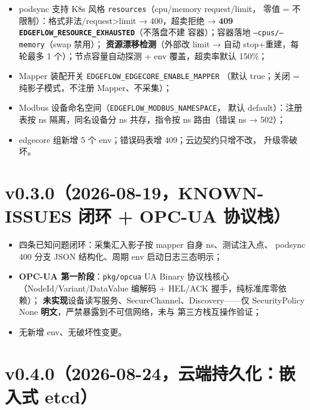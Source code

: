 \begin{itemize}
  \item podsync 支持 K8s 风格 \texttt{resources}（cpu/memory request/limit，
        零值 = 不限制）：格式非法/request>limit → 400，超卖拒绝 →
        \textbf{409 \texttt{EDGEFLOW\_RESOURCE\_EXHAUSTED}}（不落盘不建
        容器）；容器落地 \texttt{--cpus/--memory}（swap 禁用）；
        \textbf{资源漂移检测}（外部改 limit → 自动 stop+重建，每轮最多
        1 个）；节点容量自动探测 + env 覆盖，超卖率默认 150\%；
  \item Mapper 装配开关 \texttt{EDGEFLOW\_EDGECORE\_ENABLE\_MAPPER}
        （默认 true；关闭 = 纯影子模式，不注册 Mapper、不采集）；
  \item Modbus 设备命名空间（\texttt{EDGEFLOW\_MODBUS\_NAMESPACE}，
        默认 default）：注册表按 ns 隔离，同名设备分 ns 共存，指令按
        ns 路由（错误 ns → 502）；
  \item edgecore 组新增 5 个 env；错误码表增 409；云边契约只增不改，
        升级零破坏。
\end{itemize}

\section{v0.3.0（2026-08-19，KNOWN-ISSUES 闭环 + OPC-UA 协议栈）}

\begin{itemize}
  \item 四条已知问题闭环：采集汇入影子按 mapper 自身 ns、测试注入点、
        podsync 400 分支 JSON 结构化、周期 env 启动日志三态明示；
  \item \textbf{OPC-UA 第一阶段}：\texttt{pkg/opcua} UA Binary 协议栈核心
        （NodeId/Variant/DataValue 编解码 + HEL/ACK 握手，纯标准库零依赖）；
        \textbf{未实现}设备读写服务、SecureChannel、Discovery——仅
        SecurityPolicy None \textbf{明文}，严禁暴露到不可信网络，未与
        第三方栈互操作验证；
  \item 无新增 env、无破坏性变更。
\end{itemize}

\section{v0.4.0（2026-08-24，云端持久化：嵌入式 etcd）}

